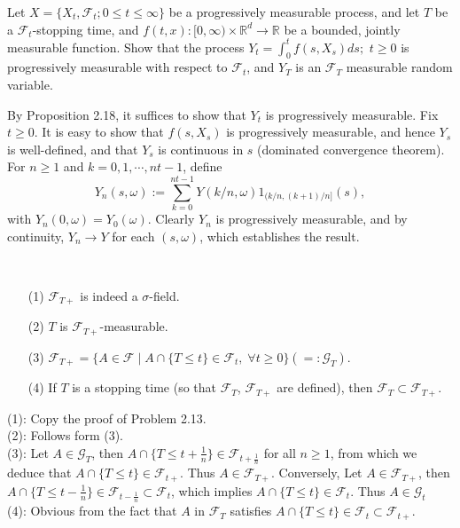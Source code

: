 \documentclass{report}
\begin{document}
\setcounter{exe}{18}
\begin{prob}
	Let \( X=\{X_t, \mathscr{F}_t;0\le t\le \infty \} \) be a progressively measurable process,
	and let \( T \) be a \( \mathscr{F}_t \)-stopping time, and \( f(t,x):[0,\infty)\times \mathbb{R}^d \to \mathbb{R} \) be a bounded, jointly measurable function.
	Show that the process \( Y_t=\int_0^t f(s,X_s)ds; \) \( t\ge0 \) is progressively measurable
	with respect to \( \mathscr{F}_t \),
	and \( Y_T \) is an \( \mathscr{F}_T \) measurable random variable.
\end{prob}
\begin{prf}
	By Proposition 2.18, it suffices to show that \( Y_t \) is progressively measurable.
	Fix \( t\ge0 \).
	It is easy to show that \( f(s,X_s) \) is progressively measurable, and hence \( Y_s \) is well-defined, and that \( Y_s \) is continuous in \( s \) (dominated convergence theorem).
	For \( n\ge1 \) and \( k=0,1,\dotsm,nt-1 \), define 
	\[Y_n(s,\omega):=\sum_{k=0}^{nt-1}Y(k/n,\omega)1_{( k/n,(k+1)/n ] }(s),\]
	with \( Y_n(0,\omega)=Y_0(\omega) \). Clearly \( Y_n \) is progressively measurable, and by continuity, \( Y_n\to Y \) for each \( (s,\omega) \), which establishes the result.
\end{prf}

\setcounter{exe}{20}
\begin{prob}
	\
	\begin{itemize}
		\item[(1)] \( \mathscr{F}_{T+} \) is indeed a \( \sigma \)-field.
		\item[(2)] \( T \) is \( \mathscr{F}_{T+} \)-measurable.
		\item[(3)] \( \mathscr{F}_{T+}=\{A\in \mathscr{F} \mid A\cap \{T\le t\}\in \mathscr{F}_t,\; \forall t\ge0\}(=:\mathscr{G}_T). \)
		\item[(4)] If \( T \) is a stopping time (so that \( \mathscr{F}_{T} \), \( \mathscr{F}_{T+} \) are defined), then \( \mathscr{F}_{T} \subset \mathscr{F}_{T+} \).
	\end{itemize}
\end{prob}
\begin{prf}
	(1): Copy the proof of Problem 2.13.\\
	(2): Follows form (3).\\
	(3): Let \( A\in \mathscr{G}_T \),
	then \( A\cap \{T\le t+\frac{1}{n}\}\in \mathscr{F}_{t+\frac{1}{n}} \) for all \( n\ge1 \),
	from which we deduce that
	\( A\cap \{ T \le t \}\in \mathscr{F}_{t+} \). Thus \( A \in \mathscr{F}_{T+} \).
	Conversely, Let \( A \in \mathscr{F}_{T+} \), then \( A\cap \{T\le t-\frac{1}{n}\}\in \mathscr{F}_{t-\frac{1}{n}}\subset \mathscr{F}_t \), which implies \( A\cap\{T\le t\}\in \mathscr{F}_t \). Thus \( A\in \mathscr{G}_t \)\\
	(4): Obvious from the fact that \( A \) in \( \mathscr{F}_T \) satisfies
	\( A\cap\{T\le t\}\in \mathscr{F}_t \subset \mathscr{F}_{t+} \).
\end{prf}
\end{document}
